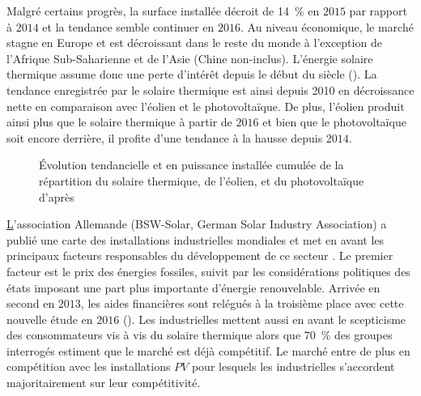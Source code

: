 Malgré certains progrès, la surface installée décroit de \SI{14}{\percent} en
$2015$ par rapport à $2014$ et la tendance semble continuer en $2016$. Au niveau
économique, le marché stagne en Europe et est décroissant dans le reste du monde à
l’exception de l’Afrique Sub-Saharienne et de l’Asie (Chine non-inclus).
L’énergie solaire thermique assume donc une perte d’intérêt depuis le début du siècle
(). La tendance enregistrée par le solaire thermique est ainsi
depuis 2010 en décroissance nette en comparaison avec l’éolien et le photovoltaïque. De
plus, l’éolien produit ainsi plus que le solaire thermique à partir de $2016$ et bien que
le photovoltaïque soit encore derrière, il profite d’une tendance à la hausse depuis
$2014$.

\begin{figure}
    \centering
    \caption{Évolution tendancielle et en puissance installée cumulée de la répartition
             du solaire thermique, de l’éolien, et du photovoltaïque d’après
             \textcite{Weiss2017}}
    \label{fig:tendances_enr}
\end{figure}
\href{http://www.sunwindenergy.com/content/solar-process-heat-surprisingly-popular}
L’association Allemande (\textsf{BSW-Solar}, German Solar Industry Association)
a publié une carte des installations industrielles mondiales et met en avant les
principaux facteurs responsables du développement de ce secteur \parencite{Augsten2017}.
Le premier facteur est le prix des énergies fossiles, suivit par les considérations
politiques des états imposant une part plus importante d’énergie renouvelable. Arrivée
en second en $2013$, les aides financières sont relégués à la troisième place avec
cette nouvelle étude en $2016$ (). Les industrielles
mettent aussi en avant le scepticisme des consommateurs vis à vis du solaire thermique
alors que \SI{70}{\percent} des groupes interrogés estiment que le marché est déjà
compétitif. Le marché entre de plus en compétition avec les installations $PV$ pour
lesquels les industrielles s’accordent majoritairement sur leur compétitivité.


